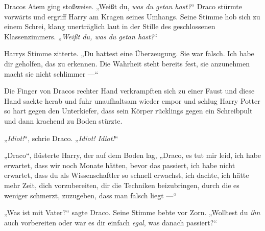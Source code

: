 Dracos Atem ging stoßweise.
„Weißt du, \emph{was du getan hast?}“ Draco stürmte vorwärts und ergriff Harry am Kragen seines Umhangs. Seine Stimme hob sich zu einem Schrei, klang unerträglich laut in der Stille des geschlossenen Klassenzimmers.
„\emph{Weißt du, was du getan hast?}“

Harrys Stimme zitterte.
„Du hattest eine Überzeugung. Sie war falsch. Ich habe dir geholfen, das zu erkennen. Die Wahrheit steht bereits fest, sie anzunehmen macht sie nicht schlimmer —“

Die Finger von Dracos rechter Hand verkrampften sich zu einer Faust und diese Hand sackte herab und fuhr unaufhaltsam wieder empor und schlug Harry Potter so hart gegen den Unterkiefer, dass sein Körper rücklings gegen ein Schreibpult und dann krachend zu Boden stürzte.

„\emph{Idiot!}“, schrie Draco.
„\emph{Idiot! Idiot!}“

„Draco“, flüsterte Harry, der auf dem Boden lag,
„Draco, es tut mir leid, ich habe erwartet, dass wir noch Monate hätten, bevor das passiert, ich habe nicht erwartet, dass du als Wissenschaftler so schnell erwachst, ich dachte, ich hätte mehr Zeit, dich vorzubereiten, dir die Techniken beizubringen, durch die es weniger schmerzt, zuzugeben, dass man falsch liegt —“

„Was ist mit Vater?“ sagte Draco. Seine Stimme bebte vor Zorn.
„Wolltest du \emph{ihn} auch vorbereiten oder war es dir einfach \emph{egal}, was danach passiert?“

